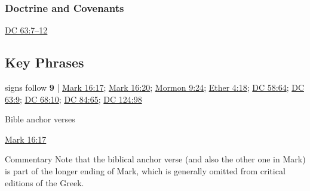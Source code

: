 	\subsubsection{Doctrine and Covenants} %
		\label{SIGN-DC}
	
		
		\begin{compactdesc}
			\item[{\hyperref[DC63-7]{DC 63:7--12}}]
		\end{compactdesc}
		
	
		
		
\subsection{Key Phrases} %
	\label{SIGN-PHRASES}

	\begin{compactdesc}
	
		\item[signs follow] \textbf{9} | \hyperref[MARK-16-17]{Mark 16:17}; \hyperref[MARK-16-20]{Mark 16:20}; \hyperref[MORMON-9-24]{Mormon 9:24}; \hyperref[ETHER-4-18]{Ether 4:18}; \hyperref[DC58-64]{DC 58:64}; \hyperref[DC63-9]{DC 63:9}; \hyperref[DC68-10]{DC 68:10}; \hyperref[DC84-65]{DC 84:65}; \hyperref[DC124-98]{DC 124:98}
			\begin{compactdesc}
				\item[Bible anchor verses] \phantom{.}
					\begin{compactdesc}
						\item[{\hyperref[MARK-16-17]{Mark 16:17}}]
					\end{compactdesc}
				\item[Commentary] Note that the biblical anchor verse (and also the other one in Mark) is part of the longer ending of Mark, which is generally omitted from critical editions of the Greek.
			\end{compactdesc}
			
	\end{compactdesc}
	
